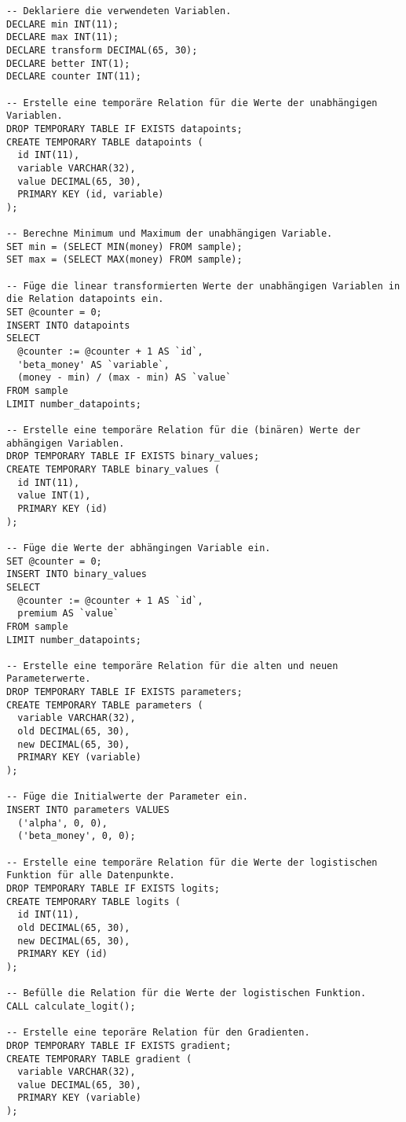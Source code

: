 \begin{verbatim}
-- Deklariere die verwendeten Variablen.
DECLARE min INT(11);
DECLARE max INT(11);
DECLARE transform DECIMAL(65, 30);
DECLARE better INT(1);
DECLARE counter INT(11);

-- Erstelle eine temporäre Relation für die Werte der unabhängigen Variablen.
DROP TEMPORARY TABLE IF EXISTS datapoints;
CREATE TEMPORARY TABLE datapoints (
  id INT(11),
  variable VARCHAR(32),
  value DECIMAL(65, 30),
  PRIMARY KEY (id, variable)
);

-- Berechne Minimum und Maximum der unabhängigen Variable.
SET min = (SELECT MIN(money) FROM sample);
SET max = (SELECT MAX(money) FROM sample);

-- Füge die linear transformierten Werte der unabhängigen Variablen in die Relation datapoints ein.
SET @counter = 0;
INSERT INTO datapoints
SELECT
  @counter := @counter + 1 AS `id`,
  'beta_money' AS `variable`,
  (money - min) / (max - min) AS `value`
FROM sample
LIMIT number_datapoints;

-- Erstelle eine temporäre Relation für die (binären) Werte der abhängigen Variablen.
DROP TEMPORARY TABLE IF EXISTS binary_values;
CREATE TEMPORARY TABLE binary_values (
  id INT(11),
  value INT(1),
  PRIMARY KEY (id)
);

-- Füge die Werte der abhängingen Variable ein.
SET @counter = 0;
INSERT INTO binary_values
SELECT
  @counter := @counter + 1 AS `id`,
  premium AS `value`
FROM sample
LIMIT number_datapoints;

-- Erstelle eine temporäre Relation für die alten und neuen Parameterwerte.
DROP TEMPORARY TABLE IF EXISTS parameters;
CREATE TEMPORARY TABLE parameters (
  variable VARCHAR(32),
  old DECIMAL(65, 30),
  new DECIMAL(65, 30),
  PRIMARY KEY (variable)
);

-- Füge die Initialwerte der Parameter ein.
INSERT INTO parameters VALUES
  ('alpha', 0, 0),
  ('beta_money', 0, 0);

-- Erstelle eine temporäre Relation für die Werte der logistischen Funktion für alle Datenpunkte.
DROP TEMPORARY TABLE IF EXISTS logits;
CREATE TEMPORARY TABLE logits (
  id INT(11),
  old DECIMAL(65, 30),
  new DECIMAL(65, 30),
  PRIMARY KEY (id)
);

-- Befülle die Relation für die Werte der logistischen Funktion.
CALL calculate_logit();

-- Erstelle eine teporäre Relation für den Gradienten.
DROP TEMPORARY TABLE IF EXISTS gradient;
CREATE TEMPORARY TABLE gradient (
  variable VARCHAR(32),
  value DECIMAL(65, 30),
  PRIMARY KEY (variable)
);


\end{verbatim}
